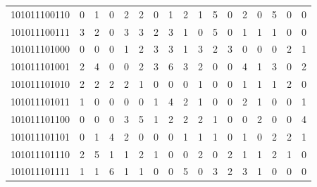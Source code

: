 \documentclass[10pt,a4paper]{article}
\begin{document}
\begin{longtable}{ |c|c|c|c|c|c|c|c|c|c|c|c|c|c|c|c|c| }
    101011100110              & 0                            & 1                                & 0                            & 2                              & 2   & 0   & 1   & 2   & 1   & 5   & 0   & 2   & 0   & 5   & 0   & 0   \\
    101011100111              & 3                            & 2                                & 0                            & 3                              & 3   & 2   & 3   & 1   & 0   & 5   & 0   & 1   & 1   & 1   & 0   & 0   \\
    101011101000              & 0                            & 0                                & 0                            & 1                              & 2   & 3   & 3   & 1   & 3   & 2   & 3   & 0   & 0   & 0   & 2   & 1   \\
    101011101001              & 2                            & 4                                & 0                            & 0                              & 2   & 3   & 6   & 3   & 2   & 0   & 0   & 4   & 1   & 3   & 0   & 2   \\
    101011101010              & 2                            & 2                                & 2                            & 2                              & 1   & 0   & 0   & 0   & 1   & 0   & 0   & 1   & 1   & 1   & 2   & 0   \\
    101011101011              & 1                            & 0                                & 0                            & 0                              & 0   & 1   & 4   & 2   & 1   & 0   & 0   & 2   & 1   & 0   & 0   & 1   \\
    101011101100              & 0                            & 0                                & 0                            & 3                              & 5   & 1   & 2   & 2   & 2   & 1   & 0   & 0   & 2   & 0   & 0   & 4   \\
    101011101101              & 0                            & 1                                & 4                            & 2                              & 0   & 0   & 0   & 1   & 1   & 1   & 0   & 1   & 0   & 2   & 2   & 1   \\
    101011101110              & 2                            & 5                                & 1                            & 1                              & 2   & 1   & 0   & 0   & 2   & 0   & 2   & 1   & 1   & 2   & 1   & 0   \\
    101011101111              & 1                            & 1                                & 6                            & 1                              & 1   & 0   & 0   & 5   & 0   & 3   & 2   & 3   & 1   & 0   & 0   & 0   \\

\end{longtable}
\end{document}
